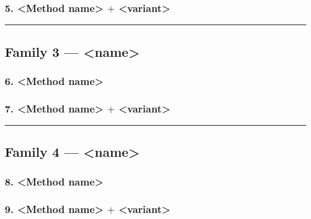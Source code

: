 \documentclass[12pt,a4paper]{article}
\begin{document}
\subsubsection{\texorpdfstring{5. <Method name> $+$ <variant>}{4. <Method name> + <variant>}}
\label{sec:method-5}

\noindent\rule{\textwidth}{0.4pt}
\FloatBarrier

\subsection{Family 3 --- <name>}
\label{sec:family-3}
%

\subsubsection{\texorpdfstring{6. <Method name>}{6. <Method name>}}
\label{sec:method-6}

\subsubsection{\texorpdfstring{7. <Method name> $+$ <variant>}{7. <Method name> + <variant>}}
\label{sec:method-7}

\noindent\rule{\textwidth}{0.4pt}
\FloatBarrier

\subsection{Family 4 --- <name>}
\label{sec:family-4}
%

\subsubsection{\texorpdfstring{8. <Method name>}{8. <Method name>}}
\label{sec:method-8}

\subsubsection{\texorpdfstring{9. <Method name> $+$ <variant>}{9. <Method name> + <variant>}}
\label{sec:method-9}
\end{document}
